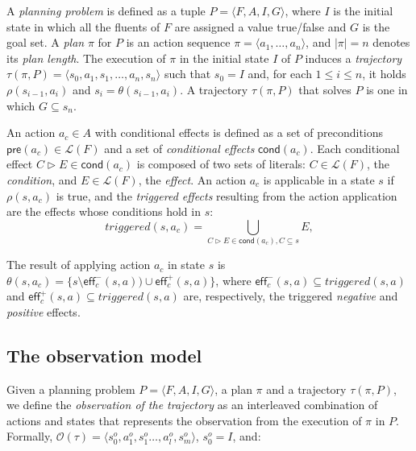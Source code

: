 \documentclass[letterpaper]{article} %
\newcommand{\tup}[1]{{\langle #1 \rangle}}
\newcommand{\pre}{\mathsf{pre}}     %
\newcommand{\eff}{\mathsf{eff}}     %
\newcommand{\cond}{\mathsf{cond}}   %
\begin{document}
A {\em planning problem} is defined as a tuple $P=\tup{F,A,I,G}$, where $I$ is the initial state in which all the fluents of $F$ are assigned a value true/false and $G$ is the goal set. A {\em plan} $\pi$ for $P$ is an action sequence $\pi=\tup{a_1, \ldots, a_n}$, and $|\pi|=n$ denotes its {\em plan length}. The execution of $\pi$ in the initial state $I$ of $P$ induces a {\em trajectory} $\tau(\pi,P)=\tup{s_0, a_1, s_1, \ldots, a_n, s_n}$ such that $s_0=I$ and, for each {\small $1\leq i\leq n$}, it holds $\rho(s_{i-1},a_i)$ and $s_i=\theta(s_{i-1},a_i)$. A trajectory $\tau(\pi,P)$ that solves $P$ is one in which $G \subseteq s_n$.

An action $a_c\in A$ with conditional effects is defined as a set of preconditions $\pre(a_c)\in\mathcal{L}(F)$ and a set of {\em conditional effects} $\cond(a_c)$. Each conditional effect $C\rhd E\in\cond(a_c)$ is composed of two sets of literals: $C\in\mathcal{L}(F)$, the {\em condition}, and $E\in\mathcal{L}(F)$, the {\em effect}. An action $a_c$ is applicable in a state $s$ if $\rho(s,a_c)$ is true, and the {\em triggered effects} resulting from the action application are the effects whose conditions hold in $s$:
\[
triggered(s,a_c)=\bigcup_{C\rhd E\in\cond(a_c),C\subseteq s} E,
\]

The result of applying action $a_c$ in state $s$ is $\theta(s,a_c)=\{s\setminus\eff_c^-(s,a))\cup\eff_c^+(s,a)\}$, where $\eff_c^-(s,a)\subseteq triggered(s,a)$ and $\eff_c^+(s,a)\subseteq triggered(s,a)$ are, respectively, the triggered {\em negative} and {\em positive} effects.


\subsection{The observation model}
Given a planning problem $P=\tup{F,A,I,G}$, a plan $\pi$ and a trajectory $\tau(\pi,P)$, we define the \emph{observation of the trajectory} as an interleaved combination of actions and states that represents the observation from the execution of $\pi$ in $P$. Formally, $\mathcal{O}(\tau)=\tup{s_0^o,a_1^o,s_1^o \ldots , a_l^o, s_m^o}$, $s_0^o=I$, and:

\end{document}
